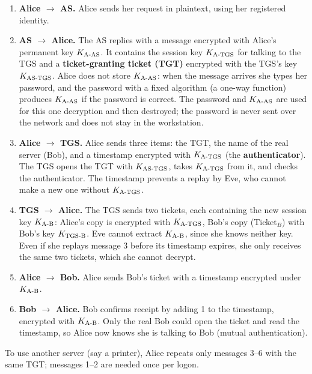 \begin{enumerate}
  \item \textbf{Alice $\to$ AS.} Alice sends her request in plaintext, using her registered identity.
  \item \textbf{AS $\to$ Alice.} The AS replies with a message encrypted with Alice's permanent key $K_{\text{A-AS}}$. It contains the session key $K_{\text{A-TGS}}$ for talking to the TGS and a \textbf{ticket-granting ticket (TGT)} encrypted with the TGS's key $K_{\text{AS-TGS}}$. Alice does not store $K_{\text{A-AS}}$: when the message arrives she types her password, and the password with a fixed algorithm (a one-way function) produces $K_{\text{A-AS}}$ if the password is correct. The password and $K_{\text{A-AS}}$ are used for this one decryption and then destroyed; the password is never sent over the network and does not stay in the workstation.
  \item \textbf{Alice $\to$ TGS.} Alice sends three items: the TGT, the name of the real server (Bob), and a timestamp encrypted with $K_{\text{A-TGS}}$ (the \textbf{authenticator}). The TGS opens the TGT with $K_{\text{AS-TGS}}$, takes $K_{\text{A-TGS}}$ from it, and checks the authenticator. The timestamp prevents a replay by Eve, who cannot make a new one without $K_{\text{A-TGS}}$.
  \item \textbf{TGS $\to$ Alice.} The TGS sends two tickets, each containing the new session key $K_{\text{A-B}}$: Alice's copy is encrypted with $K_{\text{A-TGS}}$, Bob's copy (Ticket$_B$) with Bob's key $K_{\text{TGS-B}}$. Eve cannot extract $K_{\text{A-B}}$, since she knows neither key. Even if she replays message 3 before its timestamp expires, she only receives the same two tickets, which she cannot decrypt.
  \item \textbf{Alice $\to$ Bob.} Alice sends Bob's ticket with a timestamp encrypted under $K_{\text{A-B}}$.
  \item \textbf{Bob $\to$ Alice.} Bob confirms receipt by adding 1 to the timestamp, encrypted with $K_{\text{A-B}}$. Only the real Bob could open the ticket and read the timestamp, so Alice now knows she is talking to Bob (mutual authentication).
\end{enumerate}
To use another server (say a printer), Alice repeats only messages 3--6 with the same TGT; messages 1--2 are needed once per logon.

